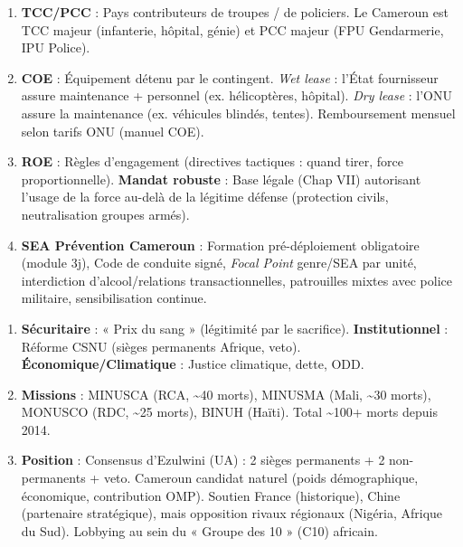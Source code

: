 \documentclass[11pt]{article}
\begin{document}
\begin{corrige}[Exercice 1]
\begin{enumerate}
    \item \textbf{TCC/PCC} : Pays contributeurs de troupes / de policiers. Le Cameroun est TCC majeur (infanterie, hôpital, génie) et PCC majeur (FPU Gendarmerie, IPU Police).
    \item \textbf{COE} : Équipement détenu par le contingent. \emph{Wet lease} : l'État fournisseur assure maintenance + personnel (ex. hélicoptères, hôpital). \emph{Dry lease} : l'ONU assure la maintenance (ex. véhicules blindés, tentes). Remboursement mensuel selon tarifs ONU (manuel COE).
    \item \textbf{ROE} : Règles d'engagement (directives tactiques : quand tirer, force proportionnelle). \textbf{Mandat robuste} : Base légale (Chap VII) autorisant l'usage de la force au-delà de la légitime défense (protection civils, neutralisation groupes armés).
    \item \textbf{SEA Prévention Cameroun} : Formation pré-déploiement obligatoire (module 3j), Code de conduite signé, \emph{Focal Point} genre/SEA par unité, interdiction d'alcool/relations transactionnelles, patrouilles mixtes avec police militaire, sensibilisation continue.
\end{enumerate}
\end{corrige}

\begin{corrige}[Exercice 2]
\begin{enumerate}
    \item \textbf{Sécuritaire} : « Prix du sang » (légitimité par le sacrifice). \textbf{Institutionnel} : Réforme CSNU (sièges permanents Afrique, veto). \textbf{Économique/Climatique} : Justice climatique, dette, ODD.
    \item \textbf{Missions} : MINUSCA (RCA, \textasciitilde 40 morts), MINUSMA (Mali, \textasciitilde 30 morts), MONUSCO (RDC, \textasciitilde 25 morts), BINUH (Haïti). Total \textasciitilde 100+ morts depuis 2014.
    \item \textbf{Position} : Consensus d'Ezulwini (UA) : 2 sièges permanents + 2 non-permanents + veto. Cameroun candidat naturel (poids démographique, économique, contribution OMP). Soutien France (historique), Chine (partenaire stratégique), mais opposition rivaux régionaux (Nigéria, Afrique du Sud). Lobbying au sein du « Groupe des 10 » (C10) africain.
\end{enumerate}
\end{corrige}
\end{document}
